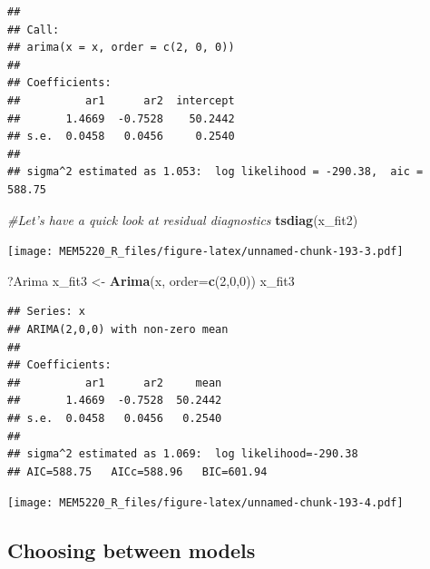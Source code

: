 \documentclass[]{book}
\newenvironment{Shaded}{\begin{snugshade}}{\end{snugshade}}
\newcommand{\CommentTok}[1]{\textcolor[rgb]{0.56,0.35,0.01}{\textit{#1}}}
\newcommand{\DataTypeTok}[1]{\textcolor[rgb]{0.13,0.29,0.53}{#1}}
\newcommand{\DecValTok}[1]{\textcolor[rgb]{0.00,0.00,0.81}{#1}}
\newcommand{\KeywordTok}[1]{\textcolor[rgb]{0.13,0.29,0.53}{\textbf{#1}}}
\newcommand{\NormalTok}[1]{#1}
\newcommand{\OperatorTok}[1]{\textcolor[rgb]{0.81,0.36,0.00}{\textbf{#1}}}
\newcommand{\StringTok}[1]{\textcolor[rgb]{0.31,0.60,0.02}{#1}}
\begin{document}
\begin{verbatim}
## 
## Call:
## arima(x = x, order = c(2, 0, 0))
## 
## Coefficients:
##          ar1      ar2  intercept
##       1.4669  -0.7528    50.2442
## s.e.  0.0458   0.0456     0.2540
## 
## sigma^2 estimated as 1.053:  log likelihood = -290.38,  aic = 588.75
\end{verbatim}

\begin{Shaded}
\begin{Highlighting}[]
\CommentTok{#Let's have a quick look at residual diagnostics}
\KeywordTok{tsdiag}\NormalTok{(x_fit2)}
\end{Highlighting}
\end{Shaded}

\texttt{[image: MEM5220\_R\_files/figure-latex/unnamed-chunk-193-3.pdf]}

\begin{Shaded}
\begin{Highlighting}[]
\NormalTok{?Arima}
\NormalTok{x_fit3 <-}\StringTok{ }\KeywordTok{Arima}\NormalTok{(x, }\DataTypeTok{order=}\KeywordTok{c}\NormalTok{(}\DecValTok{2}\NormalTok{,}\DecValTok{0}\NormalTok{,}\DecValTok{0}\NormalTok{))}
\NormalTok{x_fit3}
\end{Highlighting}
\end{Shaded}

\begin{verbatim}
## Series: x 
## ARIMA(2,0,0) with non-zero mean 
## 
## Coefficients:
##          ar1      ar2     mean
##       1.4669  -0.7528  50.2442
## s.e.  0.0458   0.0456   0.2540
## 
## sigma^2 estimated as 1.069:  log likelihood=-290.38
## AIC=588.75   AICc=588.96   BIC=601.94
\end{verbatim}

\begin{Shaded}
\end{Shaded}

\texttt{[image: MEM5220\_R\_files/figure-latex/unnamed-chunk-193-4.pdf]}

\hypertarget{choosing-between-models}{%
\subsection{Choosing between models}\label{choosing-between-models}}
\end{document}
